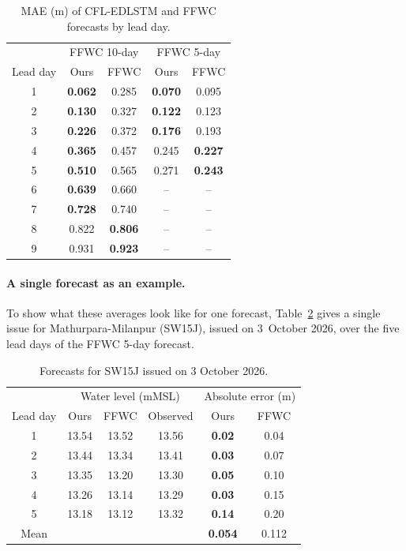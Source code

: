 \begin{table}[H]
    \centering
    \caption{MAE (m) of CFL-EDLSTM and FFWC forecasts by lead day.}
    \label{tab:ffwc}
    \begin{tabular}{c|cc|cc}
        \hline
        & \multicolumn{2}{c|}{FFWC 10-day} & \multicolumn{2}{c}{FFWC 5-day} \\
        Lead day & Ours & FFWC & Ours & FFWC \\
        \hline
        1 & \textbf{0.062} & 0.285 & \textbf{0.070} & 0.095 \\
        2 & \textbf{0.130} & 0.327 & \textbf{0.122} & 0.123 \\
        3 & \textbf{0.226} & 0.372 & \textbf{0.176} & 0.193 \\
        4 & \textbf{0.365} & 0.457 & 0.245 & \textbf{0.227} \\
        5 & \textbf{0.510} & 0.565 & 0.271 & \textbf{0.243} \\
        6 & \textbf{0.639} & 0.660 & -- & -- \\
        7 & \textbf{0.728} & 0.740 & -- & -- \\
        8 & 0.822 & \textbf{0.806} & -- & -- \\
        9 & 0.931 & \textbf{0.923} & -- & -- \\
        \hline
    \end{tabular}
\end{table}

\paragraph{A single forecast as an example.}
To show what these averages look like for one forecast,
Table~\ref{tab:ffwc_example} gives a single issue for Mathurpara-Milanpur
(SW15J), issued on 3~October 2026, over the five lead days of the FFWC 5-day
forecast.

\begin{table}[H]
    \centering
    \caption{Forecasts for SW15J issued on 3 October 2026.}
    \label{tab:ffwc_example}
    \begin{tabular}{c|ccc|cc}
        \hline
        & \multicolumn{3}{c|}{Water level (mMSL)} & \multicolumn{2}{c}{Absolute error (m)} \\
        Lead day & Ours & FFWC & Observed & Ours & FFWC \\
        \hline
        1 & 13.54 & 13.52 & 13.56 & \textbf{0.02} & 0.04 \\
        2 & 13.44 & 13.34 & 13.41 & \textbf{0.03} & 0.07 \\
        3 & 13.35 & 13.20 & 13.30 & \textbf{0.05} & 0.10 \\
        4 & 13.26 & 13.14 & 13.29 & \textbf{0.03} & 0.15 \\
        5 & 13.18 & 13.12 & 13.32 & \textbf{0.14} & 0.20 \\
        \hline
        Mean & & & & \textbf{0.054} & 0.112 \\
        \hline
    \end{tabular}
\end{table}


